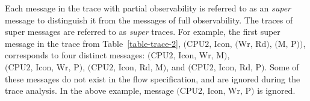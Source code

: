 \documentclass[conference]{IEEEtran}
\begin{document}
Each message in the trace with partial observability is referred to as an {\em super} message to distinguish it from the messages of full observability.  The traces of super messages are referred to as {\em super} traces.  For example, the first super message in the trace from Table~\ref{table-trace-2}, $\mbox{(CPU2, Icon, (Wr, Rd), (M, P))}$, corresponds to four distinct messages:
$\mbox{(CPU2, Icon, Wr, M)}$, $\mbox{(CPU2, Icon, Wr, P)}$, $\mbox{(CPU2, Icon, Rd, M)}$, and $\mbox{(CPU2, Icon, Rd, P)}$.  Some of these messages do not exist in the flow specification, and are ignored during the trace analysis.   In the above example, message $\mbox{(CPU2, Icon, Wr, P)}$ is ignored.

\end{document}
